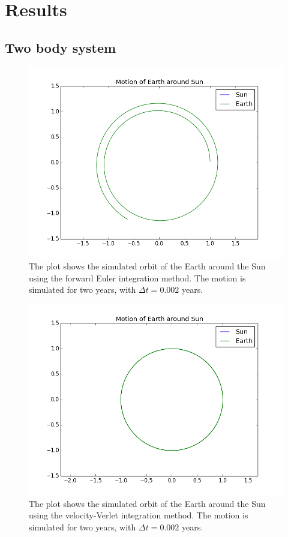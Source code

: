 \section{Results}
\subsection{Two body system}

\begin{figure}[h]
\includegraphics[scale=0.7]{figures/earth_sun_euler}
\caption{The plot shows the simulated orbit of the Earth around the Sun using the forward Euler integration method. The motion is simulated for two years, with $\Delta t = 0.002$ years.}
\end{figure}

\begin{figure}[h]
\includegraphics[scale=0.7]{figures/earth_sun_verlet}
\caption{The plot shows the simulated orbit of the Earth around the Sun using the velocity-Verlet integration method. The motion is simulated for two years, with $\Delta t = 0.002$ years.}
\end{figure}

